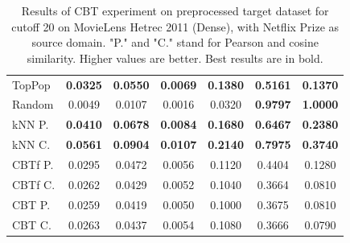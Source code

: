 \begin{table}[hbt]
\begin{tabulary}{\textwidth}{|L|CCCCCC|}
\hline
TopPop & \textbf{0.0325} & \textbf{0.0550} & \textbf{0.0069} & \textbf{0.1380} & \textbf{0.5161} & \textbf{0.1370} \\
Random & 0.0049 & 0.0107 & 0.0016 & 0.0320 & \textbf{0.9797} & \textbf{1.0000} \\
kNN P. & \textbf{0.0410} & \textbf{0.0678} & \textbf{0.0084} & \textbf{0.1680} & \textbf{0.6467} & \textbf{0.2380} \\
kNN C. & \textbf{0.0561} & \textbf{0.0904} & \textbf{0.0107} & \textbf{0.2140} & \textbf{0.7975} & \textbf{0.3740} \\
CBTf P. & 0.0295 & 0.0472 & 0.0056 & 0.1120 & 0.4404 & 0.1280 \\
CBTf C. & 0.0262 & 0.0429 & 0.0052 & 0.1040 & 0.3664 & 0.0810 \\
CBT P. & 0.0259 & 0.0419 & 0.0050 & 0.1000 & 0.3675 & 0.0810 \\
CBT C. & 0.0263 & 0.0437 & 0.0054 & 0.1080 & 0.3666 & 0.0790 \\
\hline
\end{tabulary}
\caption{Results of CBT experiment on preprocessed target dataset for cutoff 20 on MovieLens Hetrec 2011 (Dense), with Netflix Prize as source domain. "P." and "C." stand for Pearson and cosine similarity. Higher values are better. Best results are in bold.}
\end{table}

